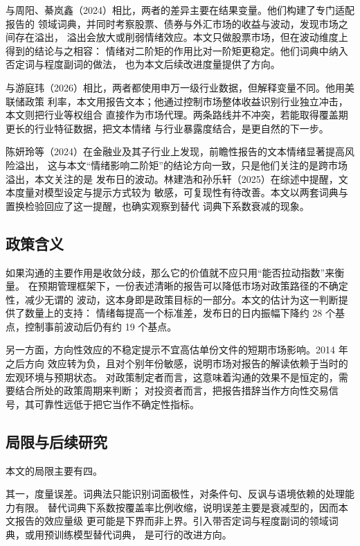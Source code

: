与周阳、綦岚鑫（2024）相比，两者的差异主要在结果变量。他们构建了专门适配报告的
领域词典，并同时考察股票、债券与外汇市场的收益与波动，发现市场之间存在溢出，
溢出会放大或削弱情绪效应。本文只做股票市场，但在波动维度上得到的结论与之相容：
情绪对二阶矩的作用比对一阶矩更稳定。他们词典中纳入否定词与程度副词的做法，
也为本文后续改进度量提供了方向。

与游庭玮（2026）相比，两者都使用申万一级行业数据，但解释变量不同。他用美联储政策
利率，本文用报告文本；他通过控制市场整体收益识别行业独立冲击，本文则把行业等权组合
直接作为市场代理。两条路线并不冲突，若能取得覆盖期更长的行业特征数据，把文本情绪
与行业暴露度结合，是更自然的下一步。

陈妍玲等（2024）在金融业及其子行业上发现，前瞻性报告的文本情绪显著提高风险溢出，
这与本文“情绪影响二阶矩”的结论方向一致，只是他们关注的是跨市场溢出，本文关注的是
发布日的波动。林建浩和孙乐轩（2025）在综述中提醒，文本度量对模型设定与提示方式较为
敏感，可复现性有待改善。本文以两套词典与置换检验回应了这一提醒，也确实观察到替代
词典下系数衰减的现象。

\subsection{政策含义}

如果沟通的主要作用是收敛分歧，那么它的价值就不应只用“能否拉动指数”来衡量。
在预期管理框架下，一份表述清晰的报告可以降低市场对政策路径的不确定性，减少无谓的
波动，这本身即是政策目标的一部分。本文的估计为这一判断提供了数量上的支持：
情绪每提高一个标准差，发布日的日内振幅下降约 28 个基点，控制事前波动后仍有约
19 个基点。

另一方面，方向性效应的不稳定提示不宜高估单份文件的短期市场影响。2014 年之后方向
效应转为负，且对个别年份敏感，说明市场对报告的解读依赖于当时的宏观环境与预期状态。
对政策制定者而言，这意味着沟通的效果不是恒定的，需要结合所处的政策周期来判断；
对投资者而言，把报告措辞当作方向性交易信号，其可靠性远低于把它当作不确定性指标。

\subsection{局限与后续研究}

本文的局限主要有四。

其一，度量误差。词典法只能识别词面极性，对条件句、反讽与语境依赖的处理能力有限。
替代词典下系数按覆盖率比例收缩，说明误差主要是衰减型的，因而本文报告的效应量级
更可能是下界而非上界。引入带否定词与程度副词的领域词典，或用预训练模型替代词典，
是可行的改进方向。


